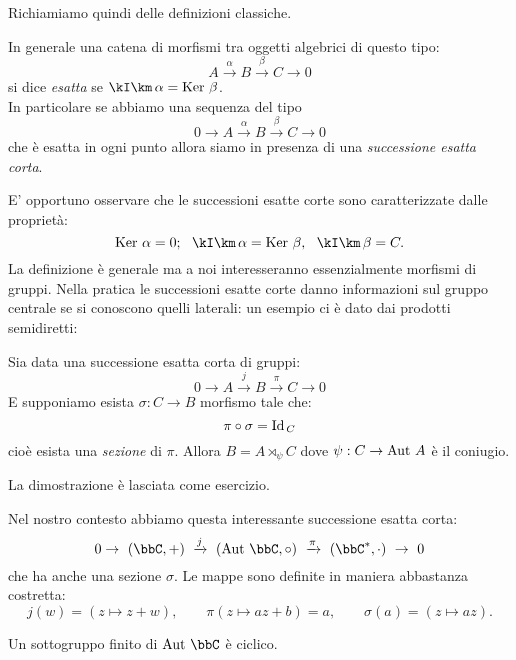 Richiamiamo quindi delle definizioni classiche.

\begin{definizione} In generale una catena di morfismi tra oggetti algebrici di questo tipo:
$$
A\xrightarrow{\alpha}B\xrightarrow{\beta}C\rightarrow 0
$$
si dice {\it esatta} se $\Im{\alpha}=\Ker{\beta}$.\\
In particolare se abbiamo una sequenza del tipo
$$
0\rightarrow A\xrightarrow{\alpha}B\xrightarrow{\beta}C \rightarrow 0
$$
che è esatta in ogni punto allora siamo in presenza di una {\it successione esatta corta}.
\end{definizione}
E' opportuno osservare che le successioni esatte corte sono caratterizzate dalle proprietà:
$$
\Ker \alpha =0;\ \ \Im \alpha =\Ker \beta,\ \ \Im \beta =C.
$$
La definizione è generale ma a noi interesseranno essenzialmente morfismi di gruppi.
Nella pratica le successioni esatte corte danno informazioni sul gruppo centrale se si conoscono quelli laterali: un esempio ci è dato dai prodotti semidiretti:
\begin{fatto}
Sia data una successione esatta corta di gruppi:
$$
0\rightarrow A\xrightarrow{j}B\xrightarrow{\pi}C \rightarrow 0
$$
E supponiamo esista $\sigma:C\rightarrow B$ morfismo tale che:
$$
\pi\circ \sigma=\text{Id}_{\, C}
$$
cioè esista  una {\it sezione} di $\pi$. Allora $B=A\rtimes_\psi C$ dove $\psi:C
\rightarrow \text{Aut } A$ è il coniugio.
\end{fatto}
La dimostrazione è lasciata come esercizio.

Nel nostro contesto abbiamo questa interessante successione esatta corta:
$$
0\rightarrow\ (\bbC,+)\ \xrightarrow{j}\ (\Aut{\bbC},\circ)\ \xrightarrow{\pi}\ (\bbC^*,\cdot)\  \rightarrow\ 0
$$
che ha anche una sezione $\sigma$. Le mappe sono definite in maniera abbastanza costretta:
$$
j(w)=(z\mapsto z+w),\qquad \pi(z\mapsto az+b)=a,\qquad \sigma(a)=(z\mapsto az).
$$
\begin{esercizio}
Un sottogruppo finito di $\Aut{\bbC}$ è ciclico.
\end{esercizio}

